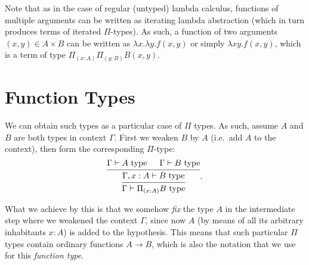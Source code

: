 Note that as in the case of regular (untyped) lambda calculus, functions of
multiple arguments can be written as iterating lambda abstraction
(which in turn produces terms of iterated $ \Pi $-types). As such,
a function of two arguments $ (x, y) \in A \times B $ can be written as
$ \lambda x . \lambda y . f(x, y) $ or simply $ \lambda xy.f(x,y) $,
which is a term of type $ \Pi_{(x : A)} \Pi_{(y : B)} B(x, y) $.

\section{Function Types}
\label{sec:dep-fun}

We can obtain such types as a particular case of $ \Pi $ types.
As such, assume $ A $ and $ B $ are both types in context $ \Gamma $.
First we weaken $ B $ by $ A $ (i.e.\ add $ A $ to the context), then
form the corresponding $ \Pi $-type:
\[
  \begin{prooftree}
    \hypo{\Gamma \vdash A \text{ type}}
    \hypo{\Gamma \vdash B \text{ type}}
    \infer2{\Gamma, x : A \vdash B \text{ type}}
    \infer1{\Gamma \vdash \Pi_{(x : A)} B \text{ type}}
  \end{prooftree}.
\]

What we achieve by this is that we somehow \emph{fix} the type $ A $
in the intermediate step where we weakened the context $ \Gamma $,
since now $ A $ (by means of all its arbitrary inhabitants $ x : A $)
is added to the hypothesis. This means that such particular $ \Pi $
types contain ordinary functions $ A \to B $, which is also the
notation that we use for this \emph{function type}.

